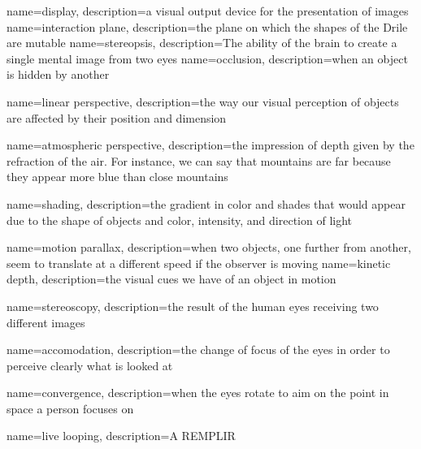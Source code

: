 {
  name=display,
  description={a visual output device for the presentation of images \cite{pimenta2012comprehensive}}
}
{
	name={interaction plane},
	description={the plane on which the shapes of the Drile are mutable}
}
{
name=stereopsis,
description={The ability of the brain to create a single mental image from two eyes}
}
{
	name=occlusion,
	description={when an object is hidden by another}
}

{
	name={linear perspective},
	description={the way our visual perception of objects are affected by their position and dimension}
}

{
	name={atmospheric perspective},
	description={the impression of depth given by the refraction of the air. For instance, we can say that mountains are far because they appear more blue than close mountains}
}	

{
	name=shading,
	description={the gradient in color and shades that would appear due to the shape of objects and color, intensity, and direction of light}
}

{
	name={motion parallax},
	description={when two objects, one further from another, seem to translate at a different speed if the observer is moving}
}
{
	name={kinetic depth},
	description={the visual cues we have of an object in motion}
}

{
	name=stereoscopy,
	description={the result of the human eyes receiving two different images}
}

{
	name=accomodation,
	description={the change of focus of the eyes in order to perceive clearly what is looked at}
}

{
	name=convergence,
	description={when the eyes rotate to aim on the point in space a person focuses on}
}


{
	name={live looping},
	description={A REMPLIR}
}